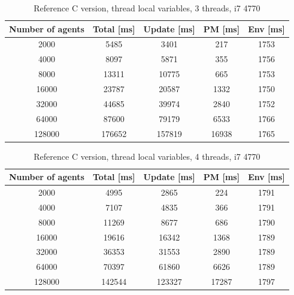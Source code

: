 \documentclass[12pt, a4paper]{report}
\begin{document}
\begin{appendices}
\begin{table}[H]
  \begin{center}
    \begin{tabular}{|c||c||c|c|c|}
    \hline
    Number of agents & Total [ms] & Update [ms] & PM [ms] & Env [ms] \\ \hline
    2000             & 5485      & 3401       & 217    & 1753    \\
    4000             & 8097      & 5871       & 355    & 1756    \\
    8000             & 13311     & 10775      & 665    & 1753    \\
    16000            & 23787     & 20587      & 1332   & 1750    \\
    32000            & 44685     & 39974      & 2840   & 1752    \\
    64000            & 87600     & 79179      & 6533   & 1766    \\
    128000           & 176652    & 157819     & 16938  & 1765    \\ \hline
    \end{tabular}
    \caption {Reference C version, thread local variables, 3 threads, i7 4770}
    \label{table:append-reference-timings-3-thread-line}
  \end{center}
\end{table}

\begin{table}[H]
  \begin{center}
    \begin{tabular}{|c||c||c|c|c|}
    \hline
    Number of agents & Total [ms] & Update [ms] & PM [ms] & Env [ms] \\ \hline
    2000             & 4995      & 2865       & 224    & 1791    \\
    4000             & 7107      & 4835       & 366    & 1791    \\
    8000             & 11269     & 8677       & 686    & 1790    \\
    16000            & 19616     & 16342      & 1368   & 1789    \\
    32000            & 36353     & 31553      & 2890   & 1789    \\
    64000            & 70397     & 61860      & 6626   & 1789    \\
    128000           & 142544    & 123327     & 17287  & 1797    \\ \hline
    \end{tabular}
    \caption {Reference C version, thread local variables, 4 threads, i7 4770}
    \label{table:append-reference-timings-4-thread-line}
  \end{center}
\end{table}


\end{appendices}
\end{document}
